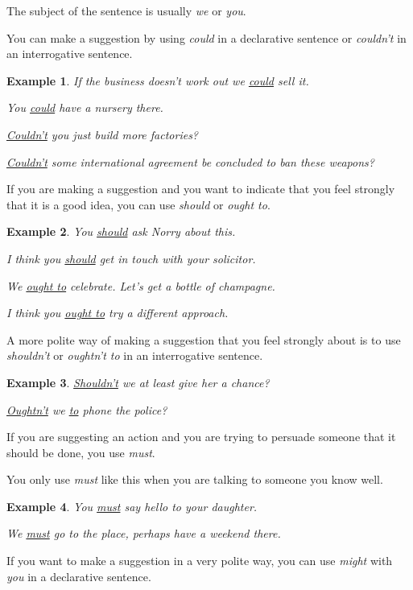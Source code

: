 \documentclass[oneside]{book}
\numberwithin{equation}{section}
\newtheorem{example}{Example}[section]
\begin{document}
The subject of the sentence is usually \textit{we} or \textit{you}.

%
\noindent{} You can make a suggestion by using \textit{could} in a declarative sentence or \textit{couldn't} in an interrogative sentence.
\begin{example}
    If the business doesn't work out we \underline{could} sell it.
    
    You \underline{could} have a nursery there.
    
    \underline{Couldn't} you just build more factories?
    
    \underline{Couldn't} some international agreement be concluded to ban these weapons?
\end{example}
%
\noindent{} If you are making a suggestion and you want to indicate that you feel strongly that it is a good idea, you can use \textit{should} or \textit{ought to}.
\begin{example}
    You \underline{should} ask Norry about this.
    
    I think you \underline{should} get in touch with your solicitor.
    
    We \underline{ought to} celebrate. Let's get a bottle of champagne.
    
    I think you \underline{ought to} try a different approach.
\end{example}
A more polite way of making a suggestion that you feel strongly about is to use \textit{shouldn't} or \textit{oughtn't to} in an interrogative sentence.
\begin{example}
    \underline{Shouldn't} we at least give her a chance?
    
    \underline{Oughtn't} we \underline{to} phone the police?
\end{example}
%
\noindent{} If you are suggesting an action and you are trying to persuade someone that it should be done, you use \textit{must}.

You only use \textit{must} like this when you are talking to someone you know well.
\begin{example}
    You \underline{must} say hello to your daughter.
    
    We \underline{must} go to the place, perhaps have a weekend there.
\end{example}
%
\noindent{} If you want to make a suggestion in a very polite way, you can use \textit{might} with \textit{you} in a declarative sentence.
\end{document}
